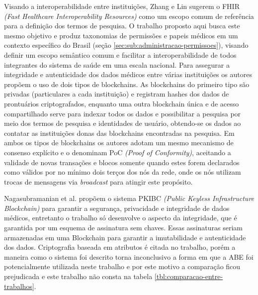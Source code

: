 \documentclass[a4paper,11pt]{article}
\begin{document}
Visando a interoperabilidade entre instituições, Zhang e Lin sugerem o FHIR \emph{(Fast Healthcare Interoperability Resources)} \cite{HL72019} como um escopo comum de referência para a definição dos termos de pesquisa.
O trabalho proposto aqui busca este mesmo objetivo e produz taxonomias de permissões e papeis médicos em um contexto específico do Brasil (seção \ref{sec:sub:administracao-permissoes}), visando definir um escopo semântico comum e facilitar a interoperabilidade de todos integrantes do sistema de saúde em uma escala nacional.
Para assegurar a integridade e autenticidade dos dados médicos entre várias instituições os autores propõem o uso de dois tipos de blockchains.
As blockchains do primeiro tipo são privadas (particulares a cada instituição) e registram hashes dos dados de prontuários criptografados, enquanto uma outra blockchain única e de acesso compartilhado serve para indexar todos os dados e possibilitar a pesquisa por meio dos termos de pesquisa e identidades de usuário, obtendo-se os dados ao contatar as instituições donas das blockchains encontradas na pesquisa.
Em ambos os tipos de blockchains os autores adotam um mesmo mecanismo de consenso explícito e o denominam PoC \emph{(Proof of Conformity)}, aceitando a validade de novas transações e blocos somente quando estes forem declarados como válidos por no mínimo dois terços dos nós da rede, onde os nós utilizam trocas de mensagens via \emph{broadcast} para atingir este propósito.

Nagasubramanian et al. \cite{Nagasubramanian2020} propõem o sistema PKIBC \emph{(Public Keyless Infrastructure Blockchain)} para garantir a segurança, privacidade e integridade de dados médicos, entretanto o trabalho só desenvolve o aspecto da integridade, que é garantida por um esquema de assinatura sem chaves.
Essas assinaturas seriam armazenadas em uma Blockchain para garantir a imutabilidade e autenticidade dos dados.
Criptografia baseada em atributos é citada no trabalho, porém a maneira como o sistema foi descrito torna inconclusivo a forma em que a ABE foi potencialmente utilizada neste trabalho e por este motivo a comparação ficou prejudicada e este trabalho não consta na tabela \ref{tbl:comparacao-entre-trabalhos}.
\end{document}
